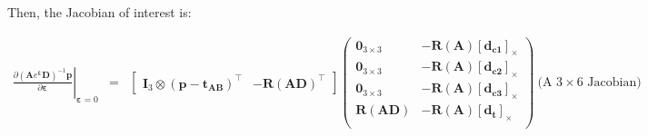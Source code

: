 \documentclass[a4paper,11pt]{report}
\newcommand{\E}{{\bm{\varepsilon}}}
\newcommand{\A}{{\mathbf{A}}}
\newcommand{\D}{{\mathbf{D}}}
\newcommand{\I}{{\mathbf{I}}}
\begin{document}
Then, the Jacobian of interest is:

\begin{eqnarray}
\left. \frac{\partial (\A e^\E \D)^{-1} \mathbf{p}}{\partial \E} \right|_{\E = 0}
&=&
\left[
\begin{array}{cc}
 \I_3 \otimes (\mathbf{p}-\mathbf{t_{AB}})^\top  & -\mathbf{R}(\A\D)^\top
\end{array}
\right]
\left(
\begin{array}{cc}
 \mathbf{0}_{3\times 3}  & -\mathbf{R}(\A) [\mathbf{d_{c1}}]_\times \\
 \mathbf{0}_{3\times 3}  & -\mathbf{R}(\A) [\mathbf{d_{c2}}]_\times \\
 \mathbf{0}_{3\times 3}  & -\mathbf{R}(\A) [\mathbf{d_{c3}}]_\times \\
 \mathbf{R}(\A\D)        & -\mathbf{R}(\A) [\mathbf{d_{t}}]_\times \\
\end{array}
\right)
~ \text{(A $3 \times 6$ Jacobian)} \nonumber
\end{eqnarray}





\end{document}
